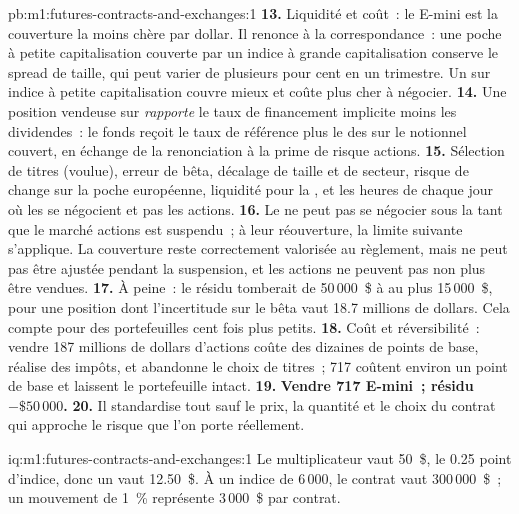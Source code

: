 \begin{solution}{pb:m1:futures-contracts-and-exchanges:1}
\textbf{13.} Liquidité et coût~: le E-mini est la couverture la moins chère par dollar.
Il renonce à la correspondance~: une poche à petite capitalisation couverte par un
indice à grande capitalisation conserve le spread de taille, qui peut varier de plusieurs
pour cent en un trimestre. Un  sur indice à petite capitalisation couvre mieux et
coûte plus cher à négocier.
\textbf{14.} Une position vendeuse sur  \emph{rapporte} le taux de financement implicite moins
les dividendes~: le fonds reçoit le taux de référence plus le 
des  sur le notionnel couvert, en échange de la renonciation à la
prime de risque actions.
\textbf{15.} Sélection de titres (voulue), erreur de bêta, décalage de taille et de
secteur, risque de change sur la poche européenne, liquidité pour la ,
et les heures de chaque jour où les  se négocient et pas les actions.
\textbf{16.} Le  ne peut pas se négocier sous la  tant que le
marché actions est suspendu~; à leur réouverture, la limite suivante s'applique. La couverture
reste correctement valorisée au règlement, mais ne peut pas être ajustée pendant la suspension, et les
actions ne peuvent pas non plus être vendues.
\textbf{17.} À peine~: le résidu tomberait de 50\,000~\$ à au plus
15\,000~\$, pour une position dont l'incertitude sur le bêta vaut 18.7 millions de dollars. Cela
compte pour des portefeuilles cent fois plus petits.
\textbf{18.} Coût et réversibilité~: vendre 187 millions de dollars d'actions coûte
des dizaines de points de base, réalise des impôts, et abandonne le choix de titres~; 717
 coûtent environ un point de base et laissent le portefeuille intact.
\textbf{19.} \textbf{Vendre 717 E-mini~; résidu $-\$50\,000$.}
\textbf{20.} Il standardise tout sauf le prix, la quantité et
le choix du contrat qui approche le risque que l'on porte réellement.
\end{solution}

\begin{solution}{iq:m1:futures-contracts-and-exchanges:1}
Le multiplicateur vaut 50~\$, le  0.25 point d'indice, donc un  vaut 12.50~\$. À
un indice de 6\,000, le contrat vaut 300\,000~\$~; un mouvement de 1~\% représente 3\,000~\$ par
contrat.
\end{solution}

